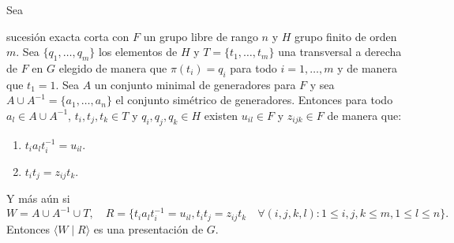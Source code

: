 \documentclass[tesis.tex]{subfiles}
\begin{document}
	\begin{prop}
		\label{prop:presentacion_vl}
		Sea  
		\begin{center}
		\end{center}
		sucesión exacta corta con $F$ un grupo libre de rango $n$ y $H$ grupo finito de orden $m$.
		Sea $\{ q_{1}, \dots, q_{m} \}$ los elementos de $H$ y $T = \{ t_{1},\dots, t_{m} \}$ una transversal a derecha de $F$ en $G$ elegido de manera que $\pi(t_{i}) = q_{i}$ para todo $i=1, \dots,m$ y de manera que $t_{1} = 1$.
		Sea $A$ un conjunto minimal de generadores para $F$ y sea $A \cup A^{-1} =  \{ a_{1}, \dots, a_{n} \}$ el conjunto simétrico de generadores.
		Entonces para todo $a_l \in A \cup A^{-1}$, $t_i,t_j,t_k \in T$ y $q_{i},q_{j},q_{k} \in H$ existen $u_{il} \in F$ y $z_{ijk} \in F$ de manera que:
		\begin{enumerate}
			\item  $t_ia_{l}t_i^{-1} = u_{il}$.
			\item  $t_it_j = z_{ij}t_k$.
		\end{enumerate}
		Y más aún si
			\[
				W = A \cup A^{-1} \cup T, \quad R = \{t_ia_{l}t_i^{-1} = u_{il},  t_it_j = z_{ij}t_k \quad \forall (i,j,k,l) :   1 \le i,j,k \le m, 1 \le l  \le n \}.
			\]
		Entonces  $\langle W \mid R \rangle$ es una presentación de $G$.
	\end{prop}
	
\end{document}
